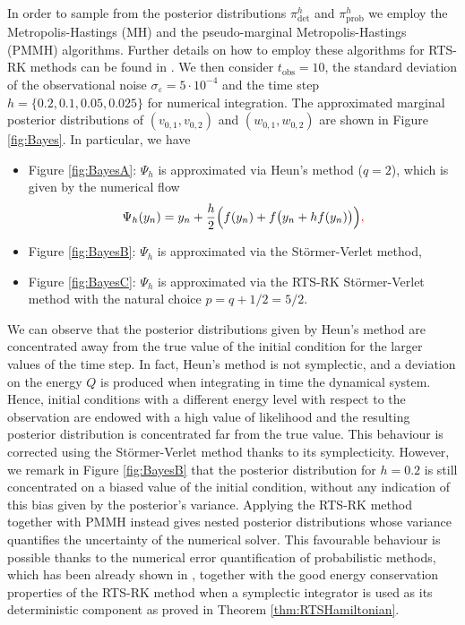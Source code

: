 \documentclass{siamart1116}
\numberwithin{theorem}{section}
\newcommand{\epl}{\varepsilon}
\newcommand{\corr}[1]{{\color{red}#1}}
\begin{document}
In order to sample from the posterior distributions $\pi^h_{\mathrm{det}}$ and $\pi^h_{\mathrm{prob}}$ we employ the Metropolis-Hastings (MH) and the pseudo-marginal Metropolis-Hastings (PMMH) algorithms. Further details on how to employ these algorithms \corr{for RTS-RK methods} can be found in \cite{AbG18}. We then consider $t_{\mathrm{obs}} = 10$, the standard deviation of the observational noise $\sigma_\epl = 5 \cdot 10^{-4}$ and the time step $h = \{0.2, 0.1, 0.05, 0.025\}$ for numerical integration. The approximated marginal posterior distributions of \corr{$(v_{0,1}, v_{0, 2})$ and $(w_{0, 1}, w_{0, 2})$} are shown in Figure \ref{fig:Bayes}. In particular, we have
\begin{itemize}[label = -]
	\item Figure \ref{fig:BayesA}\corr{: $\Psi_h$ is} approximated via Heun's method \cite{Heu00} ($q = 2$), which is given by the numerical flow 
	\begin{equation*}
		\Psi_h(y_n) = y_n + \frac{h}{2}\Big(f(y_n) + f\big(y_n + hf(y_n)\big)\Big)\corr{,}
	\end{equation*}
	\item Figure \ref{fig:BayesB}\corr{: $\Psi_h$ is} approximated via the Störmer-Verlet method,
	\item Figure \ref{fig:BayesC}\corr{: $\Psi_h$ is} approximated via the RTS-RK Störmer-Verlet method with the natural choice $p = q+1/2 = 5/2$.
\end{itemize}
We can observe that the posterior distributions given by Heun's method are concentrated away from the true value of the initial condition for the larger values of the time step. \corr{In fact,} Heun's method is not symplectic, \corr{and a deviation on the energy $Q$ is produced when integrating in time the dynamical system. Hence, initial conditions with a different energy level with respect to the observation are endowed with a high value of likelihood and the resulting posterior distribution is concentrated far from the true value.} This behaviour is corrected using the Störmer-Verlet method thanks to its symplecticity. However, we remark in Figure \ref{fig:BayesB} that the posterior distribution for $h = 0.2$ is still concentrated on a biased value of the initial condition, without any indication of this bias given by the posterior's variance. Applying the RTS-RK method together with PMMH instead gives nested posterior distributions whose variance quantifies the uncertainty of the numerical solver. This favourable behaviour is possible thanks to the \corr{numerical error quantification of probabilistic methods, which has been already shown in \cite{AbG18, CGS16, COS17}, together with the good energy conservation properties of the RTS-RK method when a symplectic integrator is used as its deterministic component as proved in Theorem \ref{thm:RTSHamiltonian}.}
\end{document}
